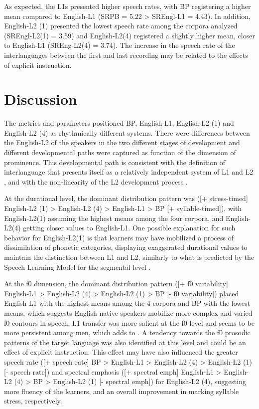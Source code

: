 As expected, the L1s presented higher speech rates, with BP registering a
higher mean compared to English-L1 (SRPB = 5.22 > SREngl-L1 = 4.43). In
addition, English-L2 (1) presented the lowest speech rate among the corpora
analyzed (SREngl-L2(1) = 3.59) and English-L2(4) registered a slightly higher
mean, closer to English-L1 (SREng-L2(4) = 3.74). The increase in the speech
rate of the interlanguages between the first and last recording may be related
to the effects of explicit instruction.

\section{Discussion}
The metrics and parameters positioned BP, English-L1, English-L2 (1) and
English-L2 (4) as rhythmically different systems. There were differences
between the English-L2 of the speakers in the two different stages of
development and different developmental paths were captured as function of the
dimension of prominence.  This developmental path is consistent with the
definition of interlanguage that presents itself as a relatively independent
system of L1 and L2 \citep{li2014}, and with the non-linearity of the L2
development process \citep{lima2019}.

At the durational level, the dominant distribution pattern was ([+ stress-timed]
English-L2 (1) > English-L2 (4) > English-L1 > BP [+ syllable-timed]), with
English-L2(1) assuming the highest means among the four corpora, and
English-L2(4) getting closer values to English-L1. One possible explanation for
such behavior for English-L2(1) is that learners may have mobilized a process
of dissimilation of phonetic categories, displaying exaggerated durational
values to maintain the distinction between L1 and L2, similarly to what is
predicted by the Speech Learning Model for the segmental level \citep{flege1995,flege2021}. %

At the f0  dimension, the dominant distribution pattern ([+ f0 variability]
English-L1 > English-L2 (4) > English-L2 (1) > BP [- f0 variability]) placed
English-L1 with the highest means among the 4 corpora and BP with the lowest
means, which suggests English native speakers mobilize more complex and varied
f0 contours in speech. L1 transfer was more salient at the f0 level and seems
to be more persistent among men, which adds to \citet{urbani2012}. A tendency
towards the f0 prosodic patterns of the target language was also identified at
this level and could be an effect of explicit instruction. This effect may have
also influenced the greater speech rate ([+ speech rate] BP > English-L1 >
English-L2 (4) > English-L2 (1) [- speech rate]) and spectral emphasis ([+
spectral emph] English-L1 > English-L2 (4) > BP > English-L2 (1) [- spectral
emph]) for English-L2 (4), suggesting more fluency of the learners, and an
overall improvement in marking syllable stress, respectively.

